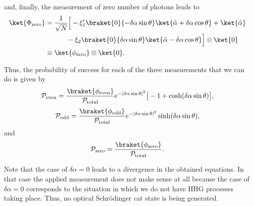 and, finally, the measurement of zero number of photons leads to
\begin{equation}
    \begin{aligned}
    \ket{\Phi_\text{zero}}
        &= \dfrac{1}{\sqrt{N}}
          \Big[
                -\xi_1' \braket{0}{-\delta \alpha \sin\theta}
                \ket{\Tilde{\alpha} + \delta \alpha \cos \theta}
                + \ket{\Tilde{\alpha}}\\
                & \hspace{1.1cm}
                - \xi_2 \braket{0}{\delta \alpha \sin\theta} \ket{\Tilde{\alpha} - \delta \alpha \cos \theta}
          \Big]\otimes \ket{0}\\
        &\equiv
        \ket{\phi_\text{zero}} \otimes \ket{0}.
    \end{aligned}
\end{equation}

Thus, the probability of success for each of the three measurements that we can do is given by
\begin{equation}
    \mathcal{P}_\text{even}
        = \dfrac{\braket{\phi_\text{even}}}{\mathcal{P}_\text{total}}
            e^{-|\delta \alpha \sin\theta|^2}
            \big[
                 -1 + \cosh(\delta\alpha \sin\theta)
            \big],
\end{equation}
\begin{equation}
    \mathcal{P}_\text{odd}
        =
        \dfrac{\braket{\phi_\text{odd}}}{\mathcal{P}_\text{total}}
            e^{-|\delta \alpha \sin\theta|^2}
            \sinh(\delta\alpha \sin\theta),
\end{equation}
and
\begin{equation}
    \mathcal{P}_\text{zero}
        =
        \dfrac{\braket{\phi_\text{zero}}}{\mathcal{P}_\text{total}}.
\end{equation}

Note that the case of $\delta \alpha = 0$ leads to a divergence in the obtained equations. In that case the applied measurement does not make sense at all because the case of $\delta \alpha = 0$ corresponds to the situation in which we do not have HHG processes taking place. Thus, no optical Schrödinger cat state is being generated.


